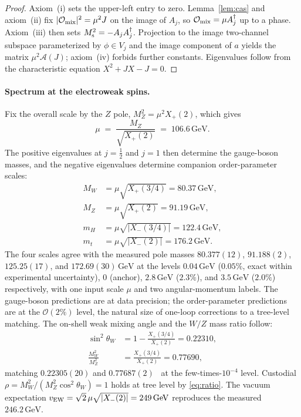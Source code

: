 \documentclass[aps,prl,twocolumn,superscriptaddress,floatfix,nofootinbib,reprint]{revtex4-2}
\newcommand{\Xp}{X_{+}}
\newcommand{\Xm}{X_{-}}
\newcommand{\half}{\tfrac12}
\newcommand{\sinsq}{\sin^{2}\!\theta_{W}}
\newcommand{\cA}{\mathcal{A}}
\begin{document}
\begin{proof}
Axiom~(i) sets the upper-left entry to zero.  Lemma~\ref{lem:cas} and
axiom~(ii) fix
$|\mathcal{O}_{\rm mix}|^{2}=\mu^{2}J$ on the image of $A_{j}$, so
$\mathcal{O}_{\rm mix}=\mu A_{j}^{\dagger}$ up to a phase.  Axiom~(iii)
then sets $M_{\rm s}^{2}=-A_{j}A_{j}^{\dagger}$.  Projection to the
image two-channel subspace parameterized by $\phi\in V_{j}$ and the
image component of $a$ yields the matrix $\mu^{2}\cA(J)$; axiom~(iv)
forbids further constants.  Eigenvalues follow from the characteristic
equation $X^{2}+JX-J=0$.
\end{proof}

\paragraph{Spectrum at the electroweak spins.}
Fix the overall scale by the $Z$ pole, $M_{Z}^{2}=\mu^{2}\Xp(2)$,
which gives
\begin{equation}
  \mu\;=\;\frac{M_{Z}}{\sqrt{\Xp(2)}}\;=\;106.6\,\text{GeV}.
\label{eq:mu}
\end{equation}
The positive eigenvalues at $j=\half$ and $j=1$ then determine the
gauge-boson masses, and the negative eigenvalues determine companion
order-parameter scales:
\begin{align}
  M_{W} &= \mu\sqrt{\Xp(3/4)} = 80.37\,\text{GeV},
  \label{eq:MW}\\
  M_{Z} &= \mu\sqrt{\Xp(2)} = 91.19\,\text{GeV},
  \label{eq:MZ}\\
  m_{H} &= \mu\sqrt{|\Xm(3/4)|} = 122.4\,\text{GeV},
  \label{eq:mH}\\
  m_{t} &= \mu\sqrt{|\Xm(2)|} = 176.2\,\text{GeV}.
  \label{eq:mt}
\end{align}
The four scales agree with the measured pole masses
$80.377(12)$, $91.188(2)$, $125.25(17)$, and $172.69(30)\,\text{GeV}$
at the levels $0.04\,\text{GeV}$ ($0.05\%$, exact within experimental
uncertainty), $0$ (anchor), $2.8\,\text{GeV}$ ($2.3\%$), and
$3.5\,\text{GeV}$ ($2.0\%$) respectively, with one input scale $\mu$
and two angular-momentum labels.  The gauge-boson predictions are at
data precision; the order-parameter predictions are at the
$\mathcal{O}(2\%)$ level, the natural size of one-loop corrections to
a tree-level matching.  The on-shell weak mixing angle and the
$W/Z$ mass ratio follow:
\begin{align}
  \sinsq &= 1-\frac{\Xp(3/4)}{\Xp(2)} = 0.22310,
  \label{eq:sinsq}\\
  \frac{M_{W}^{2}}{M_{Z}^{2}} &= \frac{\Xp(3/4)}{\Xp(2)} = 0.77690,
  \label{eq:ratio}
\end{align}
matching $0.22305(20)$ and $0.77687(2)$~\cite{PDG2024} at the
few-times-$10^{-4}$ level.  Custodial $\rho=M_{W}^{2}/(M_{Z}^{2}\cos^{2}\theta_{W})=1$
holds at tree level by \eqref{eq:ratio}.  The vacuum expectation
$v_{\rm EW}=\sqrt{2}\,\mu\sqrt{|\Xm(2)|}=249\,\text{GeV}$ reproduces
the measured $246.2\,\text{GeV}$.
\end{document}
